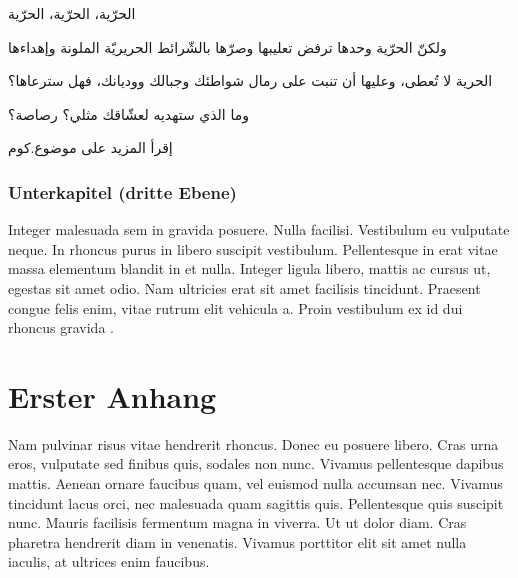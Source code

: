 \documentclass[12pt,a4paper,parskip=half]{scrartcl}
\begin{document}
\begin{Arabic} %
الحرّية، الحرّية، الحرّية

ولكنّ الحرّية وحدها ترفض تعليبها وصرّها بالشّرائط الحريريّة الملونة وإهداءها

الحرية لا تُعطى، وعليها أن تنبت على رمال شواطئك وجبالك ووديانك، فهل سترعاها؟

وما الذي ستهديه لعشّاقك مثلي؟ رصاصة؟

إقرأ المزيد على موضوع.كوم
\end{Arabic}


\subsubsection{Unterkapitel (dritte Ebene)}

Integer malesuada sem in gravida posuere. Nulla facilisi. Vestibulum eu vulputate neque. In rhoncus purus in libero suscipit vestibulum. Pellentesque in erat vitae massa elementum blandit in et nulla. Integer ligula libero, mattis ac cursus ut, egestas sit amet odio. Nam ultricies erat sit amet facilisis tincidunt. Praesent congue felis enim, vitae rutrum elit vehicula a. Proin vestibulum ex id dui rhoncus gravida \parencite{razi:kaz}.

\OWbibliography

\OWappendix

\section{Erster Anhang}

Nam pulvinar risus vitae hendrerit rhoncus. Donec eu posuere libero. Cras urna eros, vulputate sed finibus quis, sodales non nunc. Vivamus pellentesque dapibus mattis. Aenean ornare faucibus quam, vel euismod nulla accumsan nec. Vivamus tincidunt lacus orci, nec malesuada quam sagittis quis. Pellentesque quis suscipit nunc. Mauris facilisis fermentum magna in viverra. Ut ut dolor diam. Cras pharetra hendrerit diam in venenatis. Vivamus porttitor elit sit amet nulla iaculis, at ultrices enim faucibus.
\end{document}
